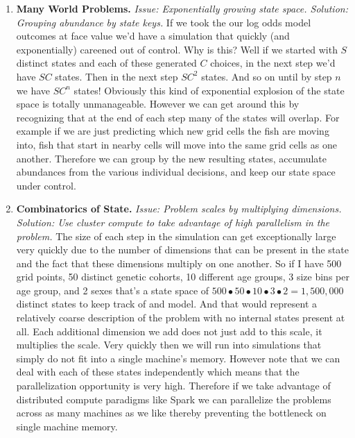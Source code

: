 \documentclass[11pt]{article}
\begin{document}
\begin{enumerate}
\item \textbf{Many World Problems.} \textit{Issue: Exponentially growing state space. Solution: Grouping abundance by state keys.} \newline If we took the our log odds model outcomes at face value we'd have a simulation that quickly (and exponentially) careened out of control. Why is this? Well if we started with $S$ distinct states and each of these generated $C$ choices, in the next step we'd have $SC$ states. Then in the next step $SC^2$ states. And so on until by step $n$ we have $SC^n$ states! Obviously this kind of exponential explosion of the state space is totally unmanageable. However we can get around this by recognizing that at the end of each step many of the states will overlap. For example if we are just predicting which new grid cells the fish are moving into, fish that start in nearby cells will move into the same grid cells as one another. Therefore we can group by the new resulting states, accumulate abundances from the various individual decisions, and keep our state space under control.
\item \textbf{Combinatorics of State.} \textit{Issue: Problem scales by multiplying dimensions. Solution: Use cluster compute to take advantage of high parallelism in the problem.} \newline The size of each step in the simulation can get exceptionally large very quickly due to the number of dimensions that can be present in the state and the fact that these dimensions multiply on one another. So if I have 500 grid points, 50 distinct genetic cohorts, 10 different age groups, 3 size bins per age group, and 2 sexes that's a state space of $500 \bullet 50 \bullet 10 \bullet 3 \bullet 2 = 1,500,000$ distinct states to keep track of and model. And that would represent a relatively coarse description of the problem with no internal states present at all. Each additional dimension we add does not just add to this scale, it multiplies the scale. Very quickly then we will run into simulations that simply do not fit into a single machine's memory. However note that we can deal with each of these states independently which means that the parallelization opportunity is very high. Therefore if we take advantage of distributed compute paradigms like Spark we can parallelize the problems across as many machines as we like thereby preventing the bottleneck on single machine memory. 

\end{enumerate}
\end{document}
